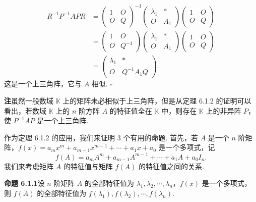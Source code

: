 \documentclass[UTF8, 12pt, fontset=fandol, oneside]{ctexart}
\begin{document}
\[
\begin{aligned}
R^{-1}P^{-1}APR
&=
\left(\begin{array}{cc}
1 & O\\
O & Q
\end{array}\right)^{-1}
\left(\begin{array}{cc}
\lambda_1 & *\\
O & A_1
\end{array}\right)
\left(\begin{array}{cc}
1 & O\\
O & Q
\end{array}\right)\\
&=
\left(\begin{array}{cc}
1 & O\\
O & Q^{-1}
\end{array}\right)
\left(\begin{array}{cc}
\lambda_1 & *\\
O & A_1
\end{array}\right)
\left(\begin{array}{cc}
1 & O\\
O & Q
\end{array}\right)\\
&=
\left(\begin{array}{cc}
\lambda_1 & *\\
O & Q^{-1}A_1Q
\end{array}\right).
\end{aligned}
\]
这是一个上三角阵，它与 $A$ 相似. $\square$

\noindent\textbf{注}\quad 虽然一般数域 $\mathbb{K}$ 上的矩阵未必相似于上三角阵，但是从定理 6.1.2 的证明可以看出，若数域 $\mathbb{K}$ 上的 $n$ 阶方阵 $A$ 的特征值全在 $\mathbb{K}$ 中，则存在 $\mathbb{K}$ 上的非异阵 $P$，使 $P^{-1}AP$ 是一个上三角阵.

作为定理 6.1.2 的应用，我们来证明 3 个有用的命题. 首先，若 $A$ 是一个 $n$ 阶矩阵，$f(x)=a_mx^m+a_{m-1}x^{m-1}+\cdots+a_1x+a_0$ 是一个多项式，记
\[
f(A)=a_mA^m+a_{m-1}A^{m-1}+\cdots+a_1A+a_0I_n.
\]
我们来考虑矩阵 $A$ 的特征值与矩阵 $f(A)$ 的特征值之间的关系.

\noindent\textbf{命题 6.1.1}\quad 设 $n$ 阶矩阵 $A$ 的全部特征值为 $\lambda_1,\lambda_2,\cdots,\lambda_n$，$f(x)$ 是一个多项式，则 $f(A)$ 的全部特征值为 $f(\lambda_1),f(\lambda_2),\cdots,f(\lambda_n)$.
\end{document}
